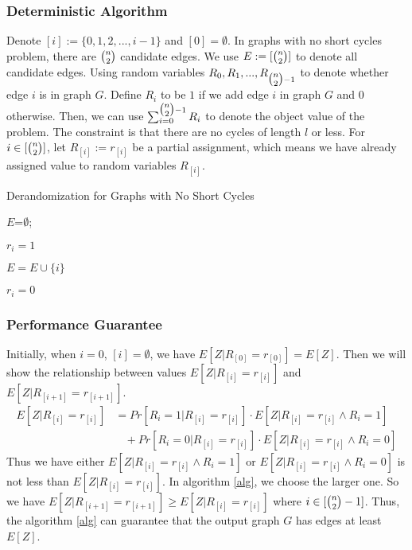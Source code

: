 \subsubsection{Deterministic Algorithm}
Denote $[i]:=\{0,1,2,...,i-1\}$ and $[0]=\emptyset$.
In graphs with no short cycles problem, there are $\tbinom{n}{2}$ candidate edges. 
We use $E:=[\tbinom{n}{2}]$ to denote all candidate edges. 
Using random variables $R_0, R_1, ..., R_{\tbinom{n}{2}-1}$ to denote whether edge $i$ is in graph $G$.
Define $R_i$ to be $1$ if we add edge $i$ in graph $G$ and $0$ otherwise. 
Then, we can use $\sum_{i=0}^{\tbinom{n}{2}-1}R_i$ to denote the object value of the problem. The constraint is that there are no cycles of length $l$ or less.
For $i\in [\tbinom{n}{2}]$, let $R_{[i]}:=r_{[i]}$ be a partial assignment, which means we have already assigned value to random variables $R_{[i]}$.


\begin{algorithm}
    \caption{Derandomization for Graphs with No Short Cycles}\label{alg}
    {
        $E$=$\emptyset$;

        {
            {
               $r_i=1$
               
               $ E=E\cup \{i\}$
            }
            \Else
            {
                $r_i=0$
            }
        
        }
    }
\end{algorithm}
\subsubsection{Performance Guarantee}

Initially, when $i=0$, $[i]=\emptyset$, we have $E[Z|R_{[0]}=r_{[0]}]=E[Z]$.
Then we will show the relationship between values $E[Z|R_{[i]}=r_{[i]}]$ and  $E[Z|R_{[i+1]}=r_{[i+1]}]$. 
\begin{align}
    \nonumber E[Z|R_{[i]}=r_{[i]}]&=Pr[R_i=1|R_{[i]}=r_{[i]}]\cdot E[Z|R_{[i]}=r_{[i]}\wedge R_i=1]\\
    \nonumber &~~~~+Pr[R_i=0|R_{[i]}=r_{[i]}]\cdot E[Z|R_{[i]}=r_{[i]}\wedge R_i=0]
\end{align}
Thus we have either $E[Z|R_{[i]}=r_{[i]}\wedge R_i=1]$ or $E[Z|R_{[i]}=r_{[i]}\wedge R_i=0]$ is not less than  $E[Z|R_{[i]}=r_{[i]}] $. In algorithm \ref{alg}, we choose the larger one. So we have $E[Z|R_{[i+1]}=r_{[i+1]}] \ge E[Z|R_{[i]}=r_{[i]}]$ where $i\in [\tbinom{n}{2}-1]$.
Thus, the algorithm \ref{alg} can guarantee that the output graph $G$ has edges at least $E[Z]$.
